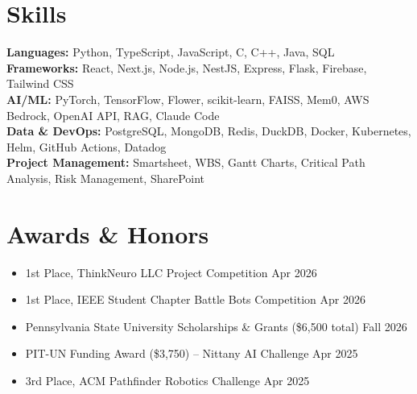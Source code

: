 \documentclass[11pt,a4paper]{article}
\newenvironment{details}{\begin{itemize}[leftmargin=1.4em, label=\textbullet, topsep=0pt, itemsep=0pt, parsep=0pt, partopsep=0pt]}{\end{itemize}}
\begin{document}
\section{Skills}
\textbf{Languages:} Python, TypeScript, JavaScript, C, C++, Java, SQL \\
\textbf{Frameworks:} React, Next.js, Node.js, NestJS, Express, Flask, Firebase, Tailwind CSS \\
\textbf{AI/ML:} PyTorch, TensorFlow, Flower, scikit-learn, FAISS, Mem0, AWS Bedrock, OpenAI API, RAG, Claude Code \\
\textbf{Data \& DevOps:} PostgreSQL, MongoDB, Redis, DuckDB, Docker, Kubernetes, Helm, GitHub Actions, Datadog \\
\textbf{Project Management:} Smartsheet, WBS, Gantt Charts, Critical Path Analysis, Risk Management, SharePoint

\section{Awards \& Honors}
\begin{details}
\item 1st Place, ThinkNeuro LLC Project Competition \hfill Apr 2026
\item 1st Place, IEEE Student Chapter Battle Bots Competition \hfill Apr 2026
\item Pennsylvania State University Scholarships \& Grants (\$6,500 total) \hfill Fall 2026
\item PIT-UN Funding Award (\$3,750) – Nittany AI Challenge \hfill Apr 2025
\item 3rd Place, ACM Pathfinder Robotics Challenge \hfill Apr 2025
\end{details}
\end{document}
